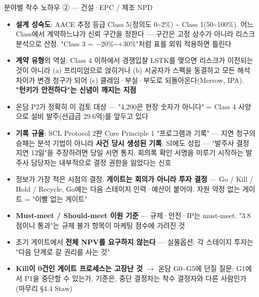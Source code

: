 \begin{frame}[allowframebreaks=1.0]{분야별 착수 노하우 ② — 건설·EPC / 제조 NPD}
\small
\par\smallskip{}\nobreak
\begin{itemize}
\item\relax \textbf{설계 성숙도}: AACE 추정 등급 Class 5(정의도 0\textasciitilde{}2\%) \textasciitilde{} Class 1(50\textasciitilde{}100\%). 어느 Class에서 계약하느냐가 신뢰 구간을 정한다 — 구간은 고정 상수가 아니라 리스크 분석으로 산정. "Class 3 = $-$20\%\textasciitilde{}+30\%"처럼 표를 외워 적용하면 틀린다
\item\relax \textbf{계약 유형}의 역설: Class 4 이하에서 경쟁입찰 LSTK를 맺으면 리스크가 이전되는 것이 아니라 (a) 프리미엄으로 얹히거나 (b) 시공자가 스펙을 동결하고 모든 해석 차이가 변경 청구가 되어 (c) 클레임·부실·부도로 되돌아온다(Merrow, IPA). \textbf{"턴키가 안전하다"는 신념이 깨지는 지점}
\item\relax 온담 P2가 정확히 이 검토 대상 — "4,200은 현장 숫자가 아니다" = Class 4 사양으로 설비 발주(선급금 29.6억)를 앞두고 있다
\item\relax \textbf{기록 규율}: SCL Protocol 2판 Core Principle 1 "프로그램과 기록" — 지연 청구의 승패는 분석 기법이 아니라 \textbf{사건 당시 생성된 기록}. SI에도 성립 — "발주사 결정 지연 12일"을 주장하려면 당일 서면 통지. 회의록 확인 서명을 미루기 시작하는 발주사 담당자는 내부적으로 결정 권한을 잃었다는 신호
\end{itemize}
\par\smallskip{}\nobreak
\begin{itemize}
\item\relax 정보가 가장 적은 시점의 결정. \textbf{게이트는 회의가 아니라 투자 결정} — Go / Kill / Hold / Recycle, Go에는 다음 스테이지 인력·예산이 붙어야. 자원 약정 없는 게이트 = "이빨 없는 게이트"
\item\relax \textbf{Must-meet / Should-meet 이원 기준} — 규제·안전·IP는 must-meet. "3.8점이니 통과"는 규제 불가 항목이 마케팅 점수에 가려진 것
\item\relax 초기 게이트에서 \textbf{전체 NPV를 요구하지 않는다} — 실물옵션: 각 스테이지 투자는 "다음 단계로 갈 권리를 사는 것"
\item\relax \textbf{Kill이 0건인 게이트 프로세스는 고장난 것} $\rightarrow$ 온담 G0\textasciitilde{}G5에 던질 질문: G1에서 P1을 중단할 수 있는가, 기준은, 중단 결정자는 착수 결정자와 다른 사람인가(마무리 §4.4 Staw)
\end{itemize}
\end{frame}

